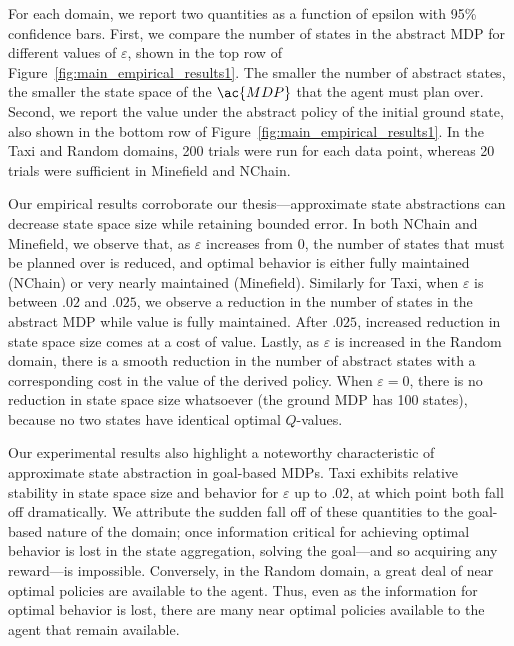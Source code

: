 For each domain, we report two quantities as a function of epsilon with 95\% confidence bars. First, we compare the number of states in the abstract \ac{MDP} for different values of $\varepsilon$, shown in the top row of Figure~\ref{fig:main_empirical_results1}. The smaller the number of abstract states, the smaller the state space of the $\ac{MDP}$ that the agent must plan over. Second, we report the value under the abstract policy of the initial ground state, also shown in the bottom row of Figure~\ref{fig:main_empirical_results1}. In the Taxi and Random domains, 200 trials were run for each data point, whereas 20 trials were sufficient in Minefield and NChain.

Our empirical results corroborate our thesis---approximate state abstractions can decrease state space size while retaining bounded error. In both NChain and Minefield, we observe that, as $\varepsilon$ increases from $0$, the number of states that must be planned over is reduced, and optimal behavior is either fully maintained (NChain) or very nearly maintained (Minefield). Similarly for Taxi, when $\varepsilon$ is between $.02$ and $.025$, we observe a reduction in the number of states in the abstract \ac{MDP} while value is fully maintained. After $.025$, increased reduction in state space size comes at a cost of value. Lastly, as $\varepsilon$ is increased in the Random domain, there is a smooth reduction in the number of abstract states with a corresponding cost in the value of the derived policy. When $\varepsilon = 0$, there is no reduction in state space size whatsoever (the ground \ac{MDP} has 100 states), because no two states have identical optimal $Q$-values.

Our experimental results also highlight a noteworthy characteristic of approximate state abstraction in goal-based \acp{MDP}. Taxi exhibits relative stability in state space size and behavior for $\varepsilon$ up to $.02$, at which point both fall off dramatically. We attribute the sudden fall off of these quantities to the goal-based nature of the domain; once information critical for achieving optimal behavior is lost in the state aggregation, solving the goal---and so acquiring any reward---is impossible. Conversely, in the Random domain, a great deal of near optimal policies are available to the agent. Thus, even as the information for optimal behavior is lost, there are many near optimal policies available to the agent that remain available. 


